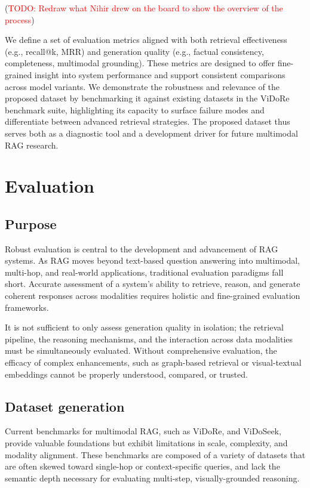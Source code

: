 \documentclass[12pt,twoside]{report}
\begin{document}
(\textcolor{red}{TODO: Redraw what Nihir drew on the board to show the overview of the process})

We define a set of evaluation metrics aligned with both retrieval effectiveness (e.g., recall@k, MRR) and generation quality (e.g., factual consistency, completeness, multimodal grounding). These metrics are designed to offer fine-grained insight into system performance and support consistent comparisons across model variants. We demonstrate the robustness and relevance of the proposed dataset by benchmarking it against existing datasets in the ViDoRe benchmark suite, highlighting its capacity to surface failure modes and differentiate between advanced retrieval strategies. The proposed dataset thus serves both as a diagnostic tool and a development driver for future multimodal RAG research.

\chapter{Evaluation}
\section{Purpose}
Robust evaluation is central to the development and advancement of RAG systems. As RAG moves beyond text-based question answering into multimodal, multi-hop, and real-world applications, traditional evaluation paradigms fall short. Accurate assessment of a system's ability to retrieve, reason, and generate coherent responses across modalities requires holistic and fine-grained evaluation frameworks.

It is not sufficient to only assess generation quality in isolation; the retrieval pipeline, the reasoning mechanisms, and the interaction across data modalities must be simultaneously evaluated. Without comprehensive evaluation, the efficacy of complex enhancements, such as graph-based retrieval or visual-textual embeddings cannot be properly understood, compared, or trusted.

\section{Dataset generation}
Current benchmarks for multimodal RAG, such as ViDoRe\cite{ColPali}, and ViDoSeek\cite{ViDoRAG}, provide valuable foundations but exhibit limitations in scale, complexity, and modality alignment. These benchmarks are composed of a variety of datasets that are often skewed toward single-hop or context-specific queries, and lack the semantic depth necessary for evaluating multi-step, visually-grounded reasoning.
\end{document}
